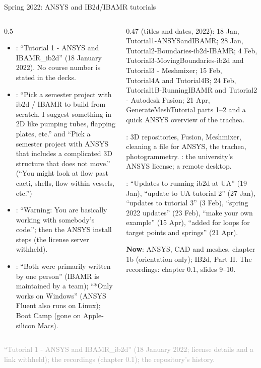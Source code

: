 \documentclass[aspectratio=169,11pt]{beamer}
\newcommand{\sourcecredit}[1]{\vfill\begin{flushright}\tiny\textcolor{DarkGray}{#1}\end{flushright}}
\begin{document}
\begin{frame}{Spring 2022: ANSYS and IB2d/IBAMR tutorials}
\label{fr:sp2022}
\begin{columns}[T,onlytextwidth]
\begin{column}{0.5\textwidth}
\scriptsize
\begin{itemize}\setlength{\itemsep}{3pt}
  \item {}: ``Tutorial 1 - ANSYS and IBAMR\_ib2d'' (18 January 2022). No course number is stated in the decks.
  \item {}: ``Pick a semester project with ib2d / IBAMR to build from scratch. I suggest something in 2D like pumping tubes, flapping plates, etc.'' and ``Pick a semester project with ANSYS that includes a complicated 3D structure that does not move.'' (``You might look at flow past cacti, shells, flow within vessels, etc.'')
  \item {}: ``Warning: You are basically working with somebody's code.''; then the ANSYS install steps (the license server withheld).
  \item {}: ``Both were primarily written by one person'' (IBAMR is maintained by a team); ``*Only works on Windows'' (ANSYS Fluent also runs on Linux); Boot Camp (gone on Apple-silicon Macs).
\end{itemize}
\end{column}
\begin{column}{0.47\textwidth}
\scriptsize
{} (titles and dates, 2022): 18 Jan, Tutorial1-ANSYSandIBAMR; 28 Jan, Tutorial2-Boundaries-ib2d-IBAMR; 4 Feb, Tutorial3-MovingBoundaries-ib2d and Tutorial3 - Meshmixer; 15 Feb, Tutorial4A and Tutorial4B; 24 Feb, Tutorial1B-RunningIBAMR and Tutorial2 - Autodesk Fusion; 21 Apr, GenerateMeshTutorial parts 1--2 and a quick ANSYS overview of the trachea.

\vspace{1mm}
: 3D repositories, Fusion, Meshmixer, cleaning a file for ANSYS, the trachea, photogrammetry. : the university's ANSYS license; a remote desktop.

\vspace{1mm}
: ``Updates to running ib2d at UA'' (19 Jan), ``update to UA tutorial 2'' (27 Jan), ``updates to tutorial 3'' (3 Feb), ``spring 2022 updates'' (23 Feb), ``make your own example'' (15 Apr), ``added for loops for target points and springs'' (21 Apr).

\begin{homebox}
\scriptsize \textbf{Now}: ANSYS, CAD and meshes, chapter 1b (orientation only); IB2d, Part II. The recordings: chapter 0.1, slides 9--10.
\end{homebox}
\end{column}
\end{columns}
\sourcecredit{``Tutorial 1 - ANSYS and IBAMR\_ib2d'' (18 January 2022; license details and a link withheld); the recordings (chapter 0.1); the repository's history.}
\end{frame}
\end{document}
